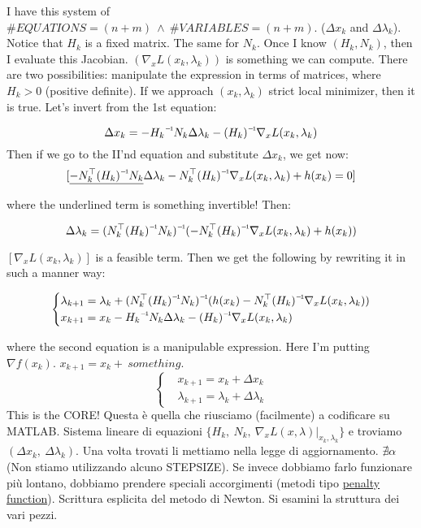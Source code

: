 I have this system of $\#EQUATIONS = (n+m)\ \land\ \#VARIABLES = (n+m)$. ($\Delta x_k$ and $\Delta\lambda_k$). Notice that $H_k$ is a fixed matrix. The same for $N_k$. Once I know $(H_k,N_k)$, then I evaluate this Jacobian. $(\nabla_x{L(x_k,\lambda_k)})$ is something we can compute. There are two possibilities: manipulate the expression in terms of matrices, where $H_k>0$ (positive definite). If we approach $(x_k,\lambda_k)$ strict local minimizer, then it is true. Let's invert from the 1st equation:

\[
	\Delta x_k = -\inv{H_k}N_k\Delta\lambda_k - \inv{(H_k)}\nabla_x{L(x_k,\lambda_k)}
\]
Then if we go to the II'nd equation and substitute $\Delta x_k$, we get now:
\[
	[\underline{-N_k^\top \inv{(H_k)}N_k}\Delta\lambda_k - N_k^\top\inv{(H_k)}\nabla_x{L(x_k,\lambda_k)} + h(x_k) = 0]
\]

where the underlined term is something invertible! Then:

\[
	\Delta\lambda_k = \inv{(N_k^\top \inv{(H_k)}N_k)}(-N_k^\top \inv{(H_k)}\nabla_x{L(x_k,\lambda_k)} + h(x_k))
\]

$[\nabla_x{L(x_k,\lambda_k)}]$ is a feasible term. Then we get the following by rewriting it in such a manner way:

\[	
	\left\{
	\begin{aligned}
	&\lambda_{k+1} = \lambda_k + \inv{(N_k^\top \inv{(H_k)}N_k)}(h(x_k) -N_k^\top \inv{(H_k)}\nabla_x{L(x_k,\lambda_k)})\\
	&x_{k+1} = x_k -\inv{H_k}N_k\Delta\lambda_k -\inv{(H_k)}\nabla_x{L(x_k,\lambda_k)}
	\end{aligned}
	\right.
\]

where the second equation is a manipulable expression. Here I'm putting $\nabla{f(x_k)}$.
$x_{k+1} = x_k +\ something$.
\[
	\left\{
	\begin{aligned}
	&x_{k+1} = x_k + \Delta x_k\\
	&\lambda_{k+1} = \lambda_k + \Delta\lambda_k
	\end{aligned}
	\right.
\]
This is the CORE! Questa è quella che riusciamo (facilmente) a codificare su MATLAB. Sistema lineare di equazioni $\{H_k,\ N_k,\ \nabla_x{L(x,\lambda)}|_{x_k,\lambda_k}\}$ e troviamo $(\Delta x_k,\ \Delta\lambda_k)$. Una volta trovati li mettiamo nella legge di aggiornamento. $\nexists\alpha$ (Non stiamo utilizzando alcuno STEPSIZE). Se invece dobbiamo farlo funzionare più lontano, dobbiamo prendere speciali accorgimenti (metodi tipo \underline{penalty function}). Scrittura esplicita del metodo di Newton. Si esamini la struttura dei vari pezzi.


